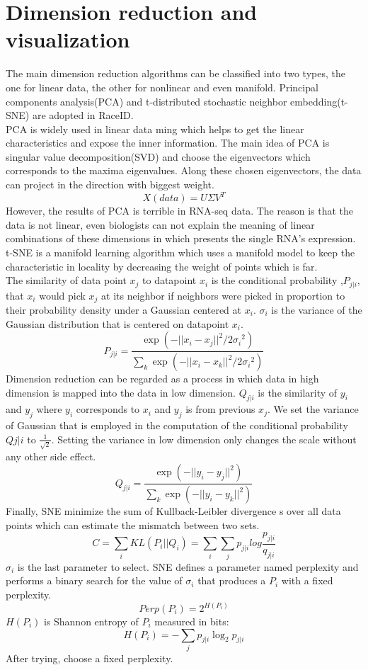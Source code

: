 \documentclass[10pt,journal]{IEEEtran}
\begin{document}
\section{Dimension reduction and visualization}
The main dimension reduction algorithms can be classified into two types, the one for linear data, the other for nonlinear and even manifold. Principal components analysis(PCA) and t-distributed stochastic neighbor embedding(t-SNE) are adopted in RaceID.\\
\hspace*{0.2 cm} PCA is widely used in linear data ming which helps to get the linear characteristics and expose the inner information. The main idea of PCA is singular value decomposition(SVD) and choose the eigenvectors which corresponds to the maxima eigenvalues. Along these chosen eigenvectors, the data can project in the direction with biggest weight.\[X(data)=U\Sigma V^T\]
However, the results of PCA is terrible in RNA-seq data. The reason is that the data is not linear, even biologists can not explain the meaning of linear combinations of these dimensions in which presents the single RNA's expression.\\
\hspace*{0.2 cm} t-SNE is a manifold learning algorithm which uses a manifold model to keep the characteristic in locality by decreasing  the weight of points which is far.\\
\hspace*{0.2 cm}The similarity of data point \(x_j\) to datapoint \(x_i\) is the conditional probability  ,\(P_{j|i}\), that \(x_i\) would pick \(x_j\) at its neighbor if neighbors  were picked in proportion to their probability density under a Gaussian centered at \(x_i\). \(\sigma_i\) is the variance of the Gaussian distribution that is centered on datapoint \(x_i\).
\[P_{j|i}=\frac{\exp(-||x_i-x_j||^2 /2{\sigma_i}^2)}{\sum_k \exp(-||x_i-x_k||^2 /2{\sigma_i}^2)}\]
\hspace*{0.2 cm}Dimension reduction can be regarded as a process in which data in high dimension is mapped into the data in low dimension. \(Q_{j|i}\) is the similarity of \(y_i\) and \(y_j\) where \(y_i\) corresponds to \(x_i\) and \(y_j\) is from previous \(x_j\). We set the variance of Gaussian that is employed in the computation of the conditional probability \(Qj|i\) to \(\frac{1}{\sqrt{2}}\). Setting the variance in low dimension only changes the scale without any other side effect.
\[Q_{j|i}=\frac{\exp(-||y_i-y_j||^2)}{\sum_k \exp(-||y_i-y_k||^2 )}\]
\hspace*{0.2 cm}Finally, SNE minimize the sum of Kullback-Leibler divergence s over all data points which can estimate the mismatch between  two sets.
\[C=\sum_i KL(P_i||Q_i)=\sum_i\sum_jp_{j|i}log\frac {p_{j|i}}{q_{j|i}} \]
\hspace*{0.2 cm} \(\sigma_i\) is the last parameter to select. SNE defines a parameter named perplexity and  performs a binary search for the value of \(\sigma_i\) that produces a \(P_i\) with a fixed perplexity.
\[Perp(P_i)=2^{H(P_i)}\]
\(H(P_i)\) is Shannon entropy of \(P_i\) measured in bits:
\[H(P_i)=-\sum_j p_{j|i} \log_2{p_{j|i}} \]
After trying, choose a fixed perplexity.
 
\end{document}
